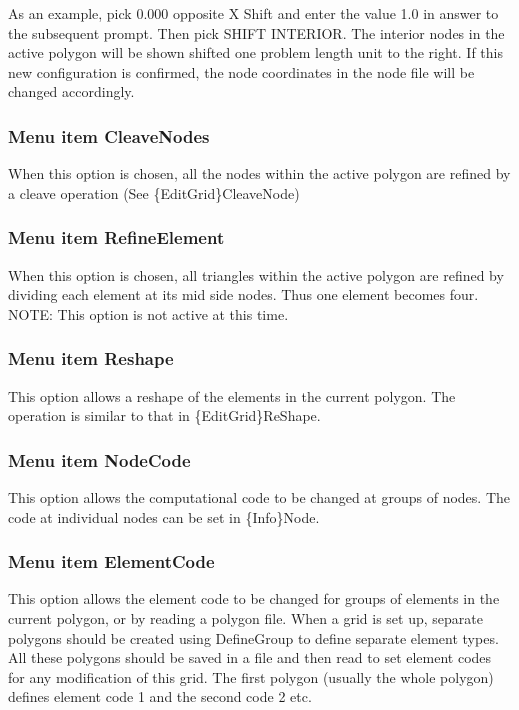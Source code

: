 \documentclass{article}
\begin{document}
As an example, pick 0.000 opposite X Shift and enter the value 1.0 in answer to the subsequent prompt. Then pick SHIFT INTERIOR. The interior nodes in the active polygon will be shown shifted one problem length unit to the right. If this new configuration is confirmed, the node coordinates in the node file will be changed accordingly.

\subsubsection[Menu item CleaveNodes]{Menu item CleaveNodes}
When this option is chosen, all the nodes within the active polygon are refined by a cleave operation (See \{EditGrid\}CleaveNode)

\subsubsection[Menu item RefineElement]{Menu item RefineElement}
When this option is chosen, all triangles within the active polygon are refined by dividing each element at its mid side nodes. Thus one element becomes four. NOTE: This option is not active at this time.

\subsubsection[Menu item Reshape]{Menu item Reshape}
This option allows a reshape of the elements in the current polygon. The operation is similar to that in \{EditGrid\}ReShape.

\subsubsection[Menu item NodeCode]{Menu item NodeCode}
This option allows the computational code to be changed at groups of nodes. The code at individual nodes can be set in \{Info\}Node.

\subsubsection[Menu item ElementCode]{Menu item ElementCode}
This option allows the element code to be changed for groups of elements in the current polygon, or by reading a polygon file. When a grid is set up, separate polygons should be created using DefineGroup to define separate element types. All these polygons should be saved in a file and then read to set element codes for any modification of this grid. The first polygon (usually the whole polygon) defines element code 1 and the second code 2 etc.
\end{document}
